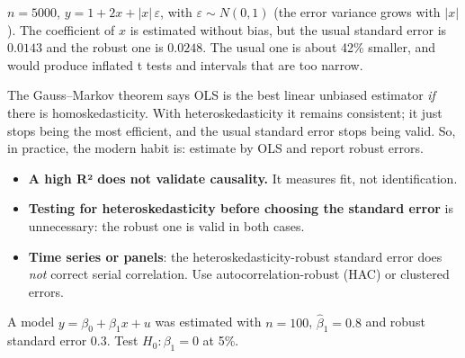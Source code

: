 \begin{simulacao}
$n=5000$, $y=1+2x+|x|\,\varepsilon$, with $\varepsilon\sim N(0,1)$ (the error variance grows with $|x|$). The coefficient of $x$ is estimated without bias, but the usual standard error is $0.0143$ and the robust one is $0.0248$. The usual one is about 42\% smaller, and would produce inflated t tests and intervals that are too narrow.
\end{simulacao}

\begin{intuicao}
The Gauss--Markov theorem says OLS is the best linear unbiased estimator \emph{if} there is homoskedasticity. With heteroskedasticity it remains consistent; it just stops being the most efficient, and the usual standard error stops being valid. So, in practice, the modern habit is: estimate by OLS and report robust errors.
\end{intuicao}

\begin{atencao}
\begin{itemize}[leftmargin=1.2em]
\item \textbf{A high R² does not validate causality.} It measures fit, not identification.
\item \textbf{Testing for heteroskedasticity before choosing the standard error} is unnecessary: the robust one is valid in both cases.
\item \textbf{Time series or panels}: the heteroskedasticity-robust standard error does \emph{not} correct serial correlation. Use autocorrelation-robust (HAC) or clustered errors.
\end{itemize}
\end{atencao}

\begin{exercicio}
A model $y=\beta_0+\beta_1 x+u$ was estimated with $n=100$, $\hat\beta_1=0.8$ and robust standard error $0.3$. Test $H_0:\beta_1=0$ at 5\%.
\end{exercicio}
